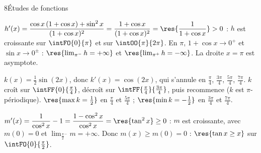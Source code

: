 \begin{corrige}{8}{Études de fonctions}
\noindent
\begin{minipage}[t]{0.52\linewidth}\vspace{0pt}\raggedright
\begin{questions}[start=3]
  \item $h'(x)=\dfrac{\cos x\,(1+\cos x)+\sin^{2}x}{(1+\cos x)^{2}}=\dfrac{1+\cos x}{(1+\cos x)^{2}}=\res{\dfrac{1}{1+\cos x}}>0$ :
    $h$ est croissante sur $\intFO{0}{\pi}$ et sur $\intOO{\pi}{2\pi}$. En $\pi$, $1+\cos x\to0^{+}$ et $\sin x\to0^{\pm}$ :
    $\res{\lim_{\pi^{-}}h=+\infty}$ et $\res{\lim_{\pi^{+}}h=-\infty}$. La droite $x=\pi$ est asymptote.
\end{questions}
\end{minipage}\hfill
\begin{minipage}[t]{0.44\linewidth}\vspace{1mm}
\centering
\begin{tableau}
\end{tableau}
\end{minipage}

\begin{questions}[start=4]
  \item $k(x)=\frac12\sin(2x)$, donc $k'(x)=\cos(2x)$, qui s'annule en $\frac{\pi}{4}$, $\frac{3\pi}{4}$, $\frac{5\pi}{4}$, $\frac{7\pi}{4}$.
    $k$ croît sur $\intFF{0}{\frac{\pi}{4}}$, décroît sur $\intFF{\frac{\pi}{4}}{\frac{3\pi}{4}}$, puis recommence ($k$ est $\pi$-périodique).
    $\res{\max k=\frac12}$ en $\frac{\pi}{4}$ et $\frac{5\pi}{4}$ ; $\res{\min k=-\frac12}$ en $\frac{3\pi}{4}$ et $\frac{7\pi}{4}$.
  \item $m'(x)=\dfrac{1}{\cos^{2}x}-1=\dfrac{1-\cos^{2}x}{\cos^{2}x}=\res{\tan^{2}x}\geq0$ : $m$ est croissante, avec $m(0)=0$ et
    $\lim_{\frac{\pi}{2}^{-}}m=+\infty$. Donc $m(x)\geq m(0)=0$ : $\res{\tan x\geq x}$ sur $\intFO{0}{\frac{\pi}{2}}$.
\end{questions}
\end{corrige}

